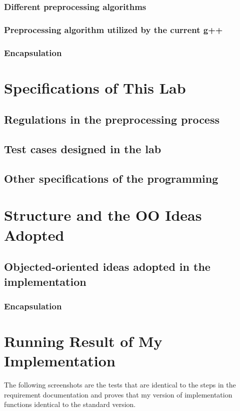 \documentclass[a4paper]{report}
\begin{document}
\subsection{Different preprocessing algorithms}


\subsection{Preprocessing algorithm utilized by the current g++}

\subsection{Encapsulation}

\chapter{Specifications of This Lab}
\section{Regulations in the preprocessing process}

\section{Test cases designed in the lab}


\section{Other specifications of the programming}

\chapter{Structure and  the OO Ideas Adopted}
\section{Objected-oriented ideas adopted in the implementation}
\subsection{Encapsulation}


\chapter{Running Result of My Implementation}
The following screenshots are the tests that are identical to the steps in the requirement documentation and proves that my version of implementation functions identical to the standard version.
\end{document}
